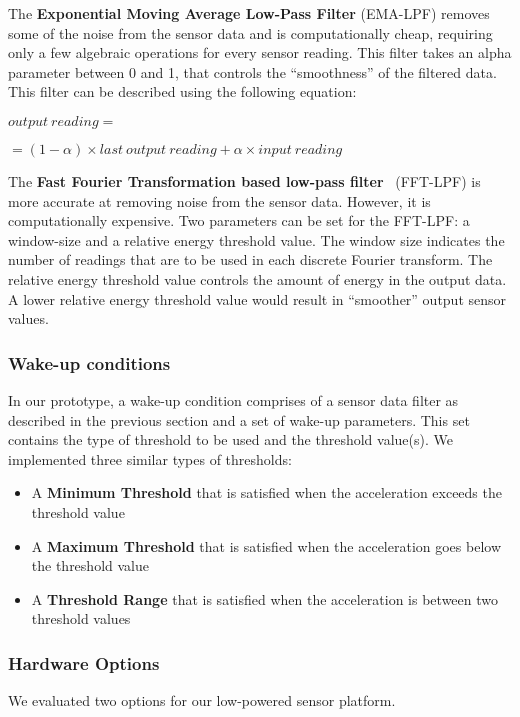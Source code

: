 The \textbf{Exponential Moving Average Low-Pass Filter} (EMA-LPF) removes some of the noise from the sensor data and is computationally cheap, requiring only a few algebraic operations for every sensor reading. This filter takes an alpha parameter between 0 and 1, that controls the ``smoothness'' of the filtered data. This filter can be described using the following equation:

$output\:reading = $

$ = (1-\alpha) \times last\:output\:reading + \alpha \times input\:reading$

The \textbf{Fast Fourier Transformation based low-pass filter}~\cite{libbyFootstepDetection} (FFT-LPF) is more accurate at removing noise from the sensor data. However, it is computationally expensive. Two parameters can be set for the FFT-LPF: a window-size and a relative energy threshold value. The window size indicates the number of readings that are to be used in each discrete Fourier transform. The relative energy threshold value controls the amount of energy in the output data. A lower relative energy threshold value would result in ``smoother'' output sensor values.

\subsubsection{Wake-up conditions}

In our prototype, a wake-up condition comprises of a sensor data filter as described in the previous section and a set of wake-up parameters. This set contains the type of threshold to be used and the threshold value(s). We implemented three similar types of thresholds:

\begin{itemize}
\setlength{\itemsep}{-3pt}  

\item A \textbf{Minimum Threshold} that is satisfied when the acceleration exceeds the threshold value

\item A \textbf{Maximum Threshold} that is satisfied when the acceleration goes below the threshold value

\item A \textbf{Threshold Range} that is satisfied when the acceleration is between two threshold values

\end{itemize}

\subsubsection{Hardware Options}
We evaluated two options for our low-powered sensor platform. 

